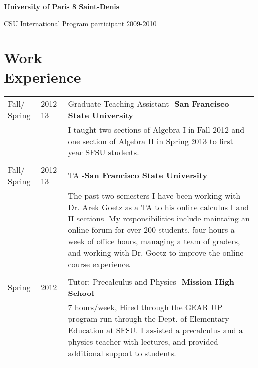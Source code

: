 \documentclass[margin,line,pifont,palatino,courier]{res}
\newenvironment{list1}{
  \begin{list}{\ding{113}}{%
      \setlength{\itemsep}{0in}
      \setlength{\parsep}{0in} \setlength{\parskip}{0in}
      \setlength{\topsep}{0in} \setlength{\partopsep}{0in}
      \setlength{\leftmargin}{0.17in}}}{\end{list}}
\begin{document}
\begin{resume}
\begin{list1}
\item {\bf University of Paris 8 Saint-Denis} 

CSU International Program participant 2009-2010\\

\end{list1}
 
 
 
\section{\sc Work\\ Experience}

\begin{tabular}{@{}p{0.75in}p{0.5in}p{4in}}


Fall/ Spring & 2012-13  & Graduate Teaching Assistant -{\bf San Francisco State University }  \\
  & 			& 	I taught two sections of Algebra I in Fall 2012  and one section of Algebra II  in Spring 2013 to first year SFSU students.  \\
  		    \\  
		
 Fall/ Spring & 2012-13  & TA -{\bf San Francisco State University }  \\	
 					& & The past two semesters I have been working with Dr. Arek Goetz as a TA to his online calculus I and II sections.  
					My responsibilities include maintaing an online forum for over 200 students, four hours a week of office hours, managing
					a team of graders, and working with Dr. Goetz to improve the online course experience.  \\ \\



Spring & 2012 & Tutor:  Precalculus and Physics -{\bf  Mission High School}\\

  &    &    7 hours/week, Hired through the GEAR UP program run through the Dept. of Elementary Education at SFSU.  I assisted a precalculus and a physics teacher with lectures, and provided additional support to students.  \\
  \\


\end{tabular}
\end{resume}
\end{document}
